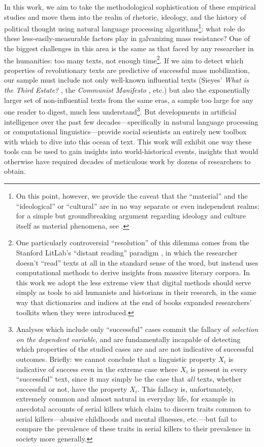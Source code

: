 In this work, we aim to take the methodological sophistication of these empirical studies and move them into the realm of rhetoric, ideology, and the history of political thought using natural language processing algorithms\footnote{On this point, however, we provide the caveat that the ``material'' and the ``ideological'' or ``cultural'' are in no way separate or even independent realms: for a simple but groundbreaking argument regarding ideology and culture itself as material phenomena, see \cite{sperber_explaining_1996}.}: what role do these less-easily-measurable factors play in galvanizing mass resistance?  %
One of the biggest challenges in this area is the same as that faced by any researcher in the humanities: too many texts, not enough time\footnote{One particularly controversial ``resolution'' of this dilemma comes from the Stanford LitLab's ``distant reading'' paradigm \citep{moretti_distant_2013}, in which the researcher doesn't ``read'' texts at all in the standard sense of the word, but instead uses computational methods to derive insights from massive literary corpora. In this work we adopt the less extreme view that digital methods should serve simply as tools to aid humanists and historians in their research, in the same way that dictionaries and indices at the end of books expanded researchers' toolkits when they were introduced.}. If we aim to detect which properties of revolutionary texts are predictive of successful mass mobilization, our sample must include not only well-known influential texts (Sieyes' \textit{What is the Third Estate?} \citep{sieyes_quest-ce_1789}, the \textit{Communist Manifesto} \citep{marx_manifesto_1848}, etc.) but also the exponentially larger set of non-influential texts from the same eras, a sample too large for any one reader to digest, much less understand\footnote{Analyses which include only ``successful'' cases commit the fallacy of \textit{selection on the dependent variable}, and are fundamentally incapable of detecting which properties of the studied cases are and are not indicative of successful outcomes. Briefly: we cannot conclude that a linguistic property $X_i$ is indicative of success even in the extreme case where $X_i$ is present in every ``successful'' text, since it may simply be the case that \textit{all} texts, whether successful or not, have the property $X_i$. This fallacy is, unfortunately, extremely common and almost natural in everyday life, for example in anecdotal accounts of serial killers which claim to discern traits common to serial killers---abusive childhoods and mental illnesses, etc.---but fail to compare the prevalence of these traits in serial killers to their prevalence in society more generally.}. But developments in artificial intelligence over the past few decades---specifically in natural language processing or computational linguistics---provide social scientists an entirely new toolbox with which to dive into this ocean of text. This work will exhibit one way these tools can be used to gain insights into world-historical events, insights that would otherwise have required decades of meticulous work by dozens of researchers to obtain. 

